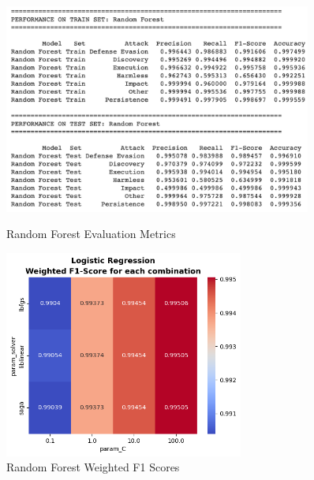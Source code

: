 \begin{figure}[H]
            \begin{minipage}{\textwidth}
                \begin{minipage}[c]{0.48\textwidth}
                    \centering
                    \includegraphics[width=0.9\textwidth]{../figures/plots/section2/Random_Forest_evaluation_metrics_1.png}
                    \caption{Random Forest Evaluation Metrics}
                    \label{fig:}
                \end{minipage}%
                \hfill%
                \begin{minipage}[c]{0.48\textwidth}
                    \centering
                    \includegraphics[width=0.7\textwidth]{../figures/plots/section2/weighted_f1_score_for_each_combination_of_parameters_logistic_regression.png}
                    \caption{Random Forest Weighted F1 Scores}
                    \label{fig:}
                \end{minipage}
            \end{minipage}
            

\end{figure}
